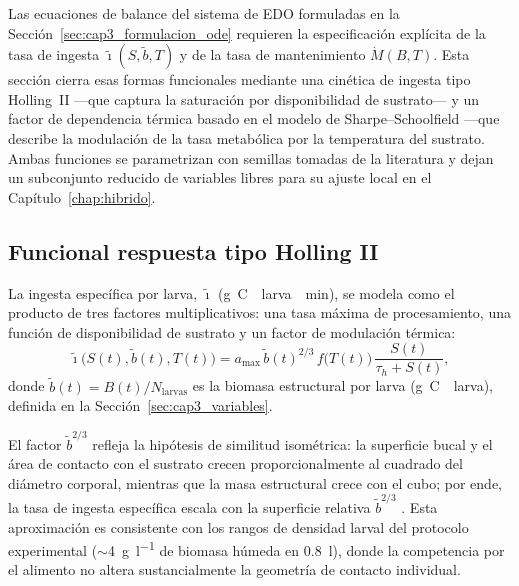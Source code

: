 
Las ecuaciones de balance del sistema de EDO formuladas en la Sección~\ref{sec:cap3_formulacion_ode} requieren la especificación explícita de la tasa de ingesta $\tilde{\imath}(S,\tilde{b},T)$ y de la tasa de mantenimiento $\dot{M}(B,T)$. Esta sección cierra esas formas funcionales mediante una cinética de ingesta tipo Holling~II ---que captura la saturación por disponibilidad de sustrato--- y un factor de dependencia térmica basado en el modelo de Sharpe--Schoolfield ---que describe la modulación de la tasa metabólica por la temperatura del sustrato. Ambas funciones se parametrizan con semillas tomadas de la literatura y dejan un subconjunto reducido de variables libres para su ajuste local en el Capítulo~\ref{chap:hibrido}.

\subsection{Funcional respuesta tipo Holling II}
\label{subsec:cap3_holling}

La ingesta específica por larva, $\tilde{\imath}$ (\si{\gram C \per larva \per \minute}), se modela como el producto de tres factores multiplicativos: una tasa máxima de procesamiento, una función de disponibilidad de sustrato y un factor de modulación térmica:
\begin{equation}
    \tilde{\imath}\bigl(S(t), \tilde{b}(t), T(t)\bigr) = a_{\max}\, \tilde{b}(t)^{2/3}\, f\bigl(T(t)\bigr)\, \frac{S(t)}{\tau_h + S(t)},
\end{equation}
donde $\tilde{b}(t) = B(t)/N_{\mathrm{larvas}}$ es la biomasa estructural por larva (\si{\gram C \per larva}), definida en la Sección~\ref{sec:cap3_variables}.

El factor $\tilde{b}^{2/3}$ refleja la hipótesis de similitud isométrica: la superficie bucal y el área de contacto con el sustrato crecen proporcionalmente al cuadrado del diámetro corporal, mientras que la masa estructural crece con el cubo; por ende, la tasa de ingesta específica escala con la superficie relativa $\tilde{b}^{2/3}$ \parencite{eriksenDynamicModellingFeed2022}. Esta aproximación es consistente con los rangos de densidad larval del protocolo experimental ($\sim$\SI{4}{\gram\per\litre} de biomasa húmeda en \SI{0,8}{\litre}), donde la competencia por el alimento no altera sustancialmente la geometría de contacto individual.

